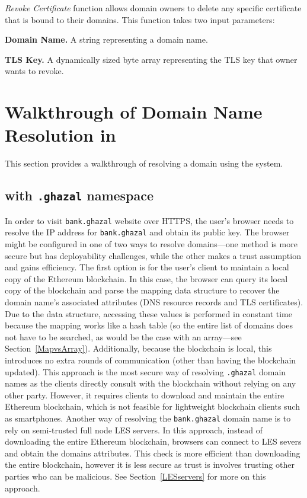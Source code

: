 \emph{Revoke Certificate} function allows domain owners to delete any specific certificate that is bound to their domains. This function takes two input parameters: \par
\textbf{Domain Name.} A string representing a domain name. \par
\textbf{TLS Key.} A dynamically sized byte array representing the TLS key that owner wants to revoke.

\section{Walkthrough of Domain Name Resolution in \Ghazalstar}

This section provides a walkthrough of resolving a domain using the \Ghazalstar system.


\subsection{\Ghazalstar with \texttt{.ghazal} namespace}

In order to visit \texttt{bank.ghazal} website over HTTPS, the user's browser needs to resolve the IP address for \texttt{bank.ghazal} and obtain its public key. The browser might be configured in one of two ways to resolve domains---one method is more secure but has deployability challenges, while the other makes a trust assumption and gains efficiency. The first option is for the user's client to maintain a local copy of the Ethereum blockchain. In this case, the browser can query its local copy of the blockchain and parse the mapping data structure to recover the domain name's associated attributes (\eg DNS resource records and TLS certificates). Due to the data structure, accessing these values is performed in constant time because the mapping works like a hash table (so the entire list of domains does not have to be searched, as would be the case with an array---see Section~\ref{MapvsArray}). Additionally, because the blockchain is local, this introduces no extra rounds of communication (other than having the blockchain updated). This approach is the most secure way of resolving \texttt{.ghazal} domain names as the clients directly consult with the blockchain without relying on any other party. However, it requires clients to download and maintain the entire Ethereum blockchain, which is not feasible for lightweight blockchain clients such as smartphones. Another way of resolving the \texttt{bank.ghazal} domain name is to rely on semi-trusted full node LES servers. In this approach, instead of downloading the entire Ethereum blockchain, browsers can connect to LES severs and obtain the domains attributes. This check is more efficient than downloading the entire blockchain, however it is less secure as trust is involves trusting other parties who can be malicious. See Section~\ref{LESservers} for more on this approach. 



